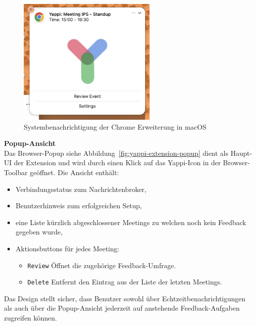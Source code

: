 \documentclass[12pt,a4paper]{report}
\begin{document}
            \begin{figure}[H]
              \centering
              \includegraphics[width=0.60\textwidth]{../figures/yappi-chrome-extension/yappi-extension-notification.jpg}
              \caption{Systembenachrichtigung der Chrome Erweiterung in macOS}
              \label{fig:yappi-extension-notification}
            \end{figure}


        \textbf{Popup-Ansicht} \\
            Das Browser-Popup siehe Abbildung~\ref{fig:yappi-extension-popup} dient als Haupt-UI der Extension und wird durch einen
            Klick auf das Yappi-Icon in der Browser-Toolbar geöffnet.
            Die Ansicht enthält:
            \begin{itemize}
                \item Verbindungsstatus zum Nachrichtenbroker,
                \item Benutzerhinweis zum erfolgreichen Setup,
                \item eine Liste kürzlich abgeschlossener Meetings zu welchen noch kein Feedback gegeben wurde,
                \item Aktionsbuttons für jedes Meeting:
                    \begin{itemize}
                        \item \texttt{Review} Öffnet die zugehörige Feedback-Umfrage.
                        \item \texttt{Delete} Entfernt den Eintrag aus der Liste der letzten Meetings.
                    \end{itemize}
            \end{itemize}
            Das Design stellt sicher, dass Benutzer sowohl über Echtzeitbenachrichtigungen als auch über die Popup-Ansicht
            jederzeit auf anstehende Feedback-Aufgaben zugreifen können.
\end{document}
